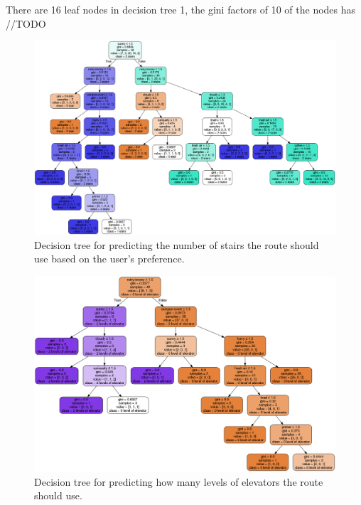 \documentclass{sigchi}
\begin{document}
There are 16 leaf nodes in decision tree 1, the gini factors of 10 of the nodes has //TODO

\begin{figure}[!h]
\centering
\includegraphics[width=2.0\columnwidth]{pics/decisionTree_1.png}
\caption{Decision tree for predicting the number of stairs the route should use based on the user’s preference.}
\label{fig:dt1}
\end{figure}

\begin{figure}[!h]
\centering
\includegraphics[width=2.0\columnwidth]{pics/decisionTree_2.png}
\caption{Decision tree for predicting how many levels of elevators the route should use.}
\label{fig:dt2}
\end{figure}
\end{document}
